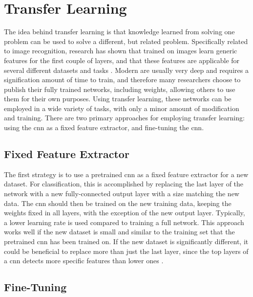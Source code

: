 \section{Transfer Learning} \label{sec:transfer-learning}

The idea behind transfer learning is that knowledge learned from solving one problem can be used to solve a different, but related problem. Specifically related to image recognition, research has shown that  trained on images learn generic features for the first couple of layers, and that these features are applicable for several different datasets and tasks \cite{transfer-learning-yosinski}. Modern  are usually very deep and requires a signification amount of time to train, and therefore many researchers choose to publish their fully trained networks, including weights, allowing others to use them for their own purposes. Using transfer learning, these networks can be employed in a wide variety of tasks, with only a minor amount of modification and training. There are two primary approaches for employing transfer learning: using the \acrshort{cnn} as a fixed feature extractor, and fine-tuning the \acrshort{cnn}. \\ 

\subsection{Fixed Feature Extractor}

The first strategy is to use a pretrained \acrshort{cnn} as a fixed feature extractor for a new dataset. For classification, this is accomplished by replacing the last layer of the network with a new fully-connected output layer with a size matching the new data. The \acrshort{cnn} should then be trained on the new training data, keeping the weights fixed in all layers, with the exception of the new output layer. Typically, a lower learning rate is used compared to training a full network. This approach works well if the new dataset is small and similar to the training set that the pretrained \acrshort{cnn} has been trained on. If the new dataset is significantly different, it could be beneficial to replace more than just the last layer, since the top layers of a \acrshort{cnn} detects more specific features than lower ones \cite{transfer-learning-cs231n}.

\subsection{Fine-Tuning}

